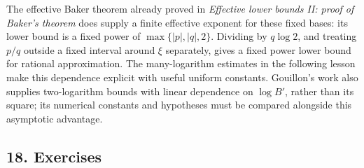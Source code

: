 \documentclass[
  11pt,
  a4paper,
]{article}
\begin{document}
The effective Baker theorem already proved in \emph{Effective lower
bounds II: proof of Baker's theorem} does supply a finite effective
exponent for these fixed bases: its lower bound is a fixed power of
\(\max\{|p|,|q|,2\}\). Dividing by \(q\log2\), and treating \(p/q\)
outside a fixed interval around \(\xi\) separately, gives a fixed power
lower bound for rational approximation. The many-logarithm estimates in
the following lesson make this dependence explicit with useful uniform
constants. Gouillon's work also supplies two-logarithm bounds with
linear dependence on \(\log B'\), rather than its square; its numerical
constants and hypotheses must be compared alongside this asymptotic
advantage.

\subsection{18. Exercises}\label{exercises}
\end{document}
